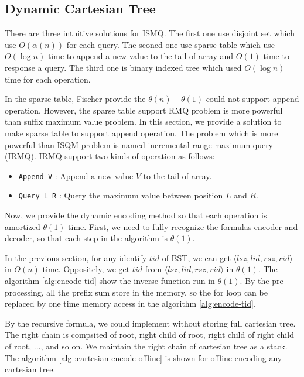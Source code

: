 

\subsection{Dynamic Cartesian Tree}

There are three intuitive solutions for ISMQ.  The first one use
disjoint set which use $O(\alpha(n))$ for each query.  The seoncd one
use sparse table which use $O(\log n)$ time to append a new value to
the tail of array and $O(1)$ time to response a query.  The third one
is binary indexed tree which used $O(\log n)$ time for each operation. 

In the sparse table, Fischer provide the $\theta(n)$ -- $\theta(1)$
could not support append operation.  However, the sparse table support
RMQ problem is more powerful than suffix maximum value problem.  In
this section, we provide a solution to make sparse table to support
append operation.  The problem which is more powerful than ISQM
problem is named incremental range maximum query (IRMQ).  IRMQ support
two kinds of operation as follows: 

\begin{itemize}
  \item 
  	\texttt{Append V} : Append a new value $V$ to the tail of array.

  \item
    \texttt{Query L R} : Query the maximum value between position $L$
and $R$. 

\end{itemize}

Now, we provide the dynamic encoding method so that each operation is
amortized $\theta(1)$ time.  First, we need to fully recognize the
formulas encoder and decoder, so that each step in the algorithm is
$\theta(1)$.

In the previous section, for any identify $\mathit{tid}$ of BST, we
can get
$\langle\mathit{lsz},\mathit{lid},\mathit{rsz},\mathit{rid}\rangle$ in
$O(n)$ time.  Oppositely, we get $\mathit{tid}$ from
$\langle\mathit{lsz},\mathit{lid},\mathit{rsz},\mathit{rid}\rangle$ in
$\theta(1)$.  The algorithm \ref{alg:encode-tid} show the inverse
function run in $\theta(1)$.  By the pre-processing, all the prefix
sum store in the memory, so the for loop can be replaced by one time
memory access in the algorithm \ref{alg:encode-tid}.



By the recursive formula,  we could implement without storing full
cartesian tree.  The right chain is compsited of root, right child of
root, right child of right child of root, ..., and so on.  We maintain
the right chain of cartesian tree as a stack.  The algorithm \ref{alg
:cartesian-encode-offline} is shown for offline encoding any cartesian
tree.

